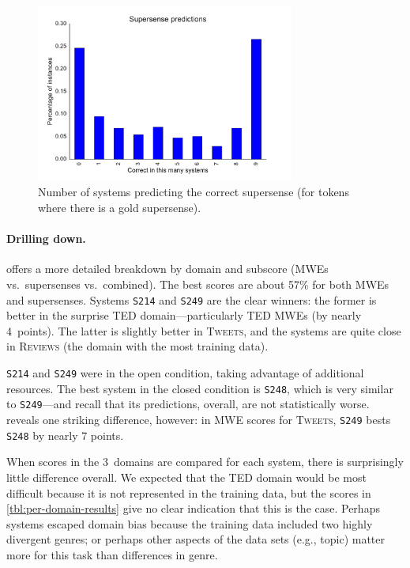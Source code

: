 \documentclass[11pt,letterpaper]{article}
\newcommand{\ensuretext}[1]{#1}
\newcommand{\ajmarker}{\ensuretext{\textcolor{purple}{\ensuremath{^{\textsc{A}}_{\textsc{J}}}}}}
\newcommand{\arkcomment}[3]{\ensuretext{\textcolor{#3}{[#1 #2]}}}
\newcommand{\aj}[1]{\arkcomment{\ajmarker}{#1}{purple}}
\newcommand{\sys}[1]{\mbox{\texttt{#1}}}   %
\newcommand{\dataset}[1]{\mbox{\textsc{#1}}}	%
\begin{document}
\begin{figure}
	\includegraphics[width=8.5cm]{figs/supersense_predictions.pdf}
	\caption{Number of systems predicting the correct supersense (for tokens where there is a gold supersense). 
}
	\label{fig:supersense-predictions}
\end{figure}


\paragraph{Drilling down.}
 offers a more detailed breakdown by domain and 
subscore (MWEs vs.~supersenses vs.~combined). 
The best scores are about 57\% for both MWEs and supersenses. 
Systems \sys{S214} and \sys{S249} are the clear winners: 
the former is better in the surprise \dataset{TED} domain---particularly TED MWEs (by nearly 4~points).
The latter is slightly better in \dataset{Tweets}, 
and the systems are quite close in \dataset{Reviews} (the domain with the most training data).

\sys{S214} and \sys{S249} were in the open condition, taking advantage of additional resources. 
The best system in the closed condition is \sys{S248}, which is very similar to \sys{S249}---and 
recall that its predictions, overall, are not statistically worse.  
 reveals one striking difference, however: 
in MWE scores for \dataset{Tweets}, \sys{S249} bests \sys{S248} by nearly 7 points.

When scores in the 3~domains are compared for each system, there is surprisingly little difference overall.
We expected that the \dataset{TED} domain would be most difficult because it is not represented 
in the training data, but the scores in \cref{tbl:per-domain-results} give no clear indication that this is the case. 
Perhaps systems escaped domain bias because the training data included two highly divergent genres; 
or perhaps other aspects of the data sets (e.g., topic) matter more for this task than 
differences in genre.  
\end{document}
